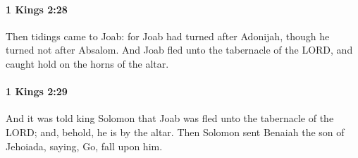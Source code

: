 		\paragraph{1 Kings 2:28} %
			\label{1KINGS-2-28}

			Then tidings came to Joab: for Joab had turned after Adonijah, though he turned not after Absalom. And Joab fled unto the tabernacle of the LORD, and caught hold on the horns of the altar.


		\paragraph{1 Kings 2:29} %
			\label{1KINGS-2-29}

			And it was told king Solomon that Joab was fled unto the tabernacle of the LORD; and, behold, he is by the altar. Then Solomon sent Benaiah the son of Jehoiada, saying, Go, fall upon him.


